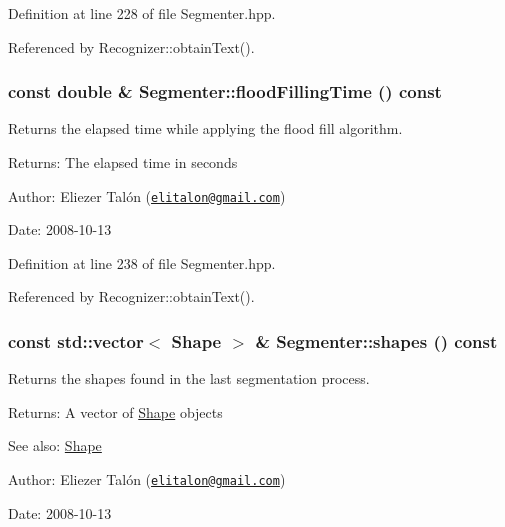 Definition at line 228 of file Segmenter.hpp.

Referenced by Recognizer::obtainText().\hypertarget{class_segmenter_e7c93cb16e314baeb713bbd6ca9b667b}{
\subsubsection[floodFillingTime]{\setlength{\rightskip}{0pt plus 5cm}const double \& Segmenter::floodFillingTime () const}}
\label{class_segmenter_e7c93cb16e314baeb713bbd6ca9b667b}


Returns the elapsed time while applying the flood fill algorithm. 

\begin{Desc}
\item[Returns:]The elapsed time in seconds\end{Desc}
\begin{Desc}
\item[Author:]Eliezer Talón (\href{mailto:elitalon@gmail.com}{\tt elitalon@gmail.com}) \end{Desc}
\begin{Desc}
\item[Date:]2008-10-13 \end{Desc}


Definition at line 238 of file Segmenter.hpp.

Referenced by Recognizer::obtainText().\hypertarget{class_segmenter_f2dd7f34c8b0f902323005335e41bd57}{
\subsubsection[shapes]{\setlength{\rightskip}{0pt plus 5cm}const std::vector$<$ {\bf Shape} $>$ \& Segmenter::shapes () const}}
\label{class_segmenter_f2dd7f34c8b0f902323005335e41bd57}


Returns the shapes found in the last segmentation process. 

\begin{Desc}
\item[Returns:]A vector of \hyperlink{class_shape}{Shape} objects\end{Desc}
\begin{Desc}
\item[See also:]\hyperlink{class_shape}{Shape}\end{Desc}
\begin{Desc}
\item[Author:]Eliezer Talón (\href{mailto:elitalon@gmail.com}{\tt elitalon@gmail.com}) \end{Desc}
\begin{Desc}
\item[Date:]2008-10-13 \end{Desc}


